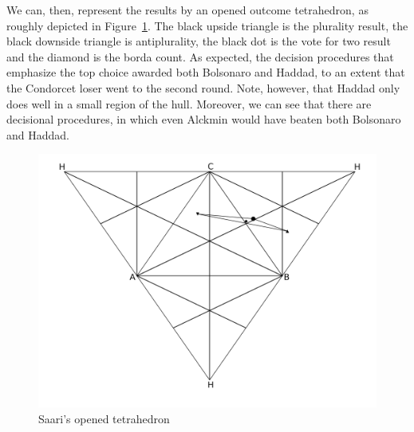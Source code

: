 \documentclass[hidelinks,11pt]{article}
\begin{document}


We can, then, represent the results by an opened outcome tetrahedron, as roughly
depicted in Figure~\ref{fig:ot}. The black upside triangle is the plurality
result, the black downside triangle is antiplurality, the black dot is the vote
for two result and the diamond is the borda count. As expected, the decision
procedures that emphasize the top choice awarded both Bolsonaro and Haddad, to
an extent that the Condorcet loser went to the second round. Note, however, that
Haddad only does well in a small region of the hull. Moreover, we can see that
there are decisional procedures, in which even Alckmin would have beaten both
Bolsonaro and Haddad.

\begin{figure}[H]
 \centering
 \includegraphics[width=0.8\columnwidth,
 height=0.3\textheight]{./images/opened_tetrahedron1.png}
 \caption{Saari's opened tetrahedron }
 \label{fig:ot}
\end{figure}
\end{document}
